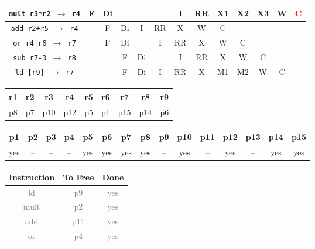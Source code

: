 \documentclass[12pt]{article}
\begin{document}
\begin{enumerate}
\begin{table}[H]
\begin{tabular}{|c|c|c|c|c|c|c|c|c|c|c|c|c|}
					\hline
					\texttt{mult r3*r2 $\rightarrow$ r4} & F & Di &  &  &  & I & RR & X1 & X2 & X3 & W & \textcolor{red}{C}\\
					\hline
					\texttt{add r2+r5 $\rightarrow$ r4} &  & F & Di & I & RR & X & W & C &  &  &  &\\
					\hline
					\texttt{or r4|r6 $\rightarrow$ r7} &  & F & Di &  & I & RR & X & W & C &  &  &\\
					\hline
					\texttt{sub r7-3 $\rightarrow$ r8} &  &  & F & Di &  & I & RR & X & W & C &  &\\
					\hline
					\texttt{ld [r9] $\rightarrow$ r7} &  &  & F & Di & I & RR & X & M1 & M2 & W & C &\\
					\hline 
				\end{tabular}
			\end{table}
			\begin{table}[H]
				\begin{tabular}{|c|c|c|c|c|c|c|c|c|}
					\hline
					r1 & r2 & r3 & r4 & r5 & r6 & r7 & r8 & r9\\
					\hline
					p8 & p7 & p10 & p12 & p5 & p1 & p15 & p14 & p6\\
					\hline
				\end{tabular}
			\end{table}
			\begin{table}[H]
				\begin{tabular}{|c|c|c|c|c|c|c|c|c|c|c|c|c|c|c|}
					\hline
					p1 & p2 & p3 & p4 & p5 & p6 & p7 & p8 & p9 & p10 & p11 & p12 & p13 & p14 & p15\\
					\hline
					yes & \textcolor{red}{--} & -- & -- & yes & yes & yes & yes & -- & yes & -- & yes & -- & yes & yes\\
					\hline
				\end{tabular}
			\end{table}
			\begin{table}[H]
				\begin{tabular}{|c|c|c|}
					\hline
					Instruction & To Free & Done\\
					\hline
					\textcolor{gray}{ld} & \textcolor{gray}{p9} & \textcolor{gray}{yes}\\
					\hline
					\textcolor{gray}{mult} & \textcolor{gray}{p2} & \textcolor{gray}{yes}\\
					\hline
					\textcolor{gray}{add} & \textcolor{gray}{p11} & \textcolor{gray}{yes}\\
					\hline
					\textcolor{gray}{or} & \textcolor{gray}{p4} & \textcolor{gray}{yes}\\

\end{tabular}
\end{table}
\end{enumerate}
\end{document}
